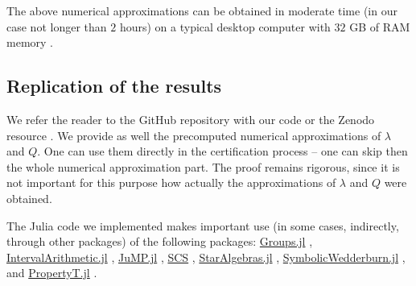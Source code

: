 \documentclass[12pt]{amsart}
\theoremstyle{definition}
\numberwithin{figure}{section}
\numberwithin{table}{section}
\numberwithin{equation}{section}
\begin{document}
The above numerical approximations can be obtained in moderate time (in our case not longer than $2$ hours) on a typical desktop computer with $32$ GB of RAM memory . 

\subsection{Replication of the results}
We refer the reader to the GitHub repository with our code \cite{mizerka_pra_complexity_2025} or the Zenodo resource \cite{marcinkowski_mizerka_2025_17981235}. We provide as well the precomputed numerical approximations of $\lambda$ and $Q$. One can use them directly in the certification process -- one can skip then the whole numerical approximation part. The proof remains rigorous, since it is not important for this purpose how actually the approximations of $\lambda$ and $Q$ were obtained.

The Julia \cite{Julia-2017} code we implemented \cite{mizerka_pra_complexity_2025} makes important use (in some cases, indirectly, through other packages) of the following packages: \href{https://github.com/kalmarek/Groups.jl}{Groups.jl} \cite{MR4023374,MR4224715}, \href{https://github.com/JuliaIntervals/IntervalArithmetic.jl}{IntervalArithmetic.jl} \cite{Sanders2023IntervalArithmetic}, \href{https://jump.dev/}{JuMP.jl} \cite{Lubin2023JuMP}, \href{https://github.com/cvxgrp/scs}{SCS} \cite{ODonoghue2016Conic}, \href{https://github.com/JuliaAlgebra/StarAlgebras.jl}{StarAlgebras.jl} \cite{MR4023374,MR4224715}, \href{https://github.com/kalmarek/SymbolicWedderburn.jl}{SymbolicWedderburn.jl} \cite{MR4023374,MR4224715}, and \href{https://github.com/kalmarek/PropertyT.jl}{PropertyT.jl} \cite{kaluba_PropertyTjl_2024}.



\end{document}

